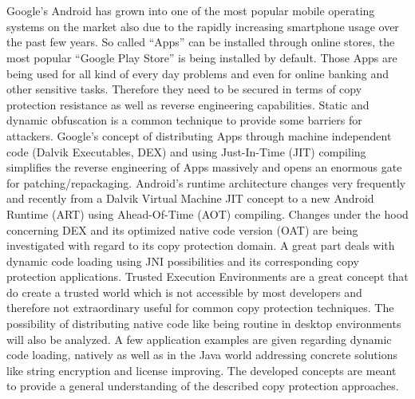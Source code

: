 \chapter*{\abstractname}
Google's Android has grown into one of the most popular mobile operating systems on the market also due to the rapidly increasing smartphone usage
over the past few years. So called ``Apps'' can be installed through
online stores, the most popular ``Google Play Store'' is being installed by default. Those Apps are being used for all kind of every day problems and
even for online banking and other sensitive tasks. Therefore they need
to be secured in terms of copy protection resistance as well as reverse
engineering capabilities. Static and dynamic obfuscation is a common
technique to provide some barriers for attackers. Google's concept of
distributing Apps through machine independent code (Dalvik Executables, DEX) and using Just-In-Time (JIT) compiling simplifies the reverse engineering of Apps massively and opens an enormous gate for patching/repackaging. Android's runtime architecture changes very frequently and recently from a Dalvik Virtual Machine JIT concept to a new Android Runtime (ART) using Ahead-Of-Time (AOT) compiling. Changes under the hood concerning DEX and its optimized native code version (OAT) are being investigated with regard to its copy protection domain.
A great part deals with dynamic code loading using JNI possibilities and its
corresponding copy protection applications. Trusted Execution Environments
are a great concept that do create a trusted world which is not accessible
by most developers and therefore not extraordinary useful for common copy
protection techniques. The possibility of distributing native code like
being routine in desktop environments will also be analyzed. A few application
examples are given regarding dynamic code loading, natively as well as in the Java world addressing concrete solutions like string encryption and license
improving. The developed concepts are meant to provide a general understanding of the described copy protection approaches.

